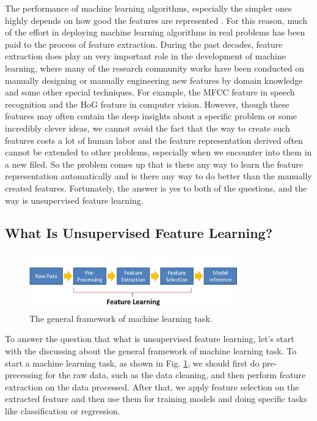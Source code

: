 \documentclass[conference]{IEEEtran}
\begin{document}
The performance of machine learning algorithms, especially the simpler ones  highly depends on how good the features are represented \cite{review}. For this reason, much of the effort in deploying machine learning algorithms in real problems has been paid to the process of feature extraction. During the past decades, feature extraction does play an very important role in the development of machine learning, where many of the research community works have been conducted on manually designing or manually engineering new features by domain knowledge and some other special techniques. For example, the MFCC feature in speech recognition and the HoG feature in computer vision. However, though these features may often contain the deep insights about a specific problem or some incredibly clever ideas, we cannot avoid the fact that the way to create such features costs a lot of human labor and the feature representation derived often cannot be extended to other problems, especially when we encounter into them in a new filed. So the problem comes up that is there any way to learn the feature representation automatically and is there any way to do better than the manually created features. Fortunately, the answer is yes to both of the questions, and the way is unsupervised feature learning.

\subsection{What Is Unsupervised Feature Learning?}

\begin{figure}[t]
\centering
\includegraphics[width=90mm]{feature_learning.pdf}
\caption{The general framework of machine learning task.}
\label{fig:ml_task}
\end{figure}

To answer the question that what is unsupervised feature learning, let's start with the discussing about the general framework of machine learning task. To start a machine learning task, as shown in Fig. \ref{fig:ml_task}, we should first do pre-precessing for the raw data, such as the data cleaning, and then perform feature extraction on the data processed. After that, we apply feature selection on the extracted feature and then use them for training models and doing specific tasks like classification or regression.
\end{document}
